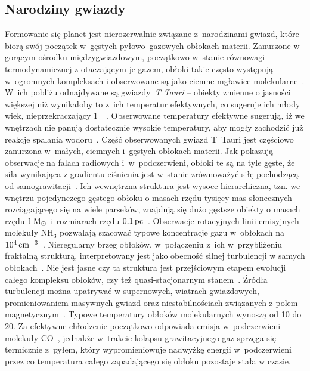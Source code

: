 \subsection{Narodziny gwiazdy}
Formowanie się planet jest nierozerwalnie związane z~narodzinami gwiazd, które
biorą swój początek w~gęstych pyłowo--gazowych obłokach materii. Zanurzone w
gorącym ośrodku międzygwiazdowym, początkowo w~stanie równowagi termodynamicznej
z otaczającym je gazem, obłoki takie często występują w~ogromnych kompleksach i
obserwowane są jako ciemne mgławice molekularne~\cite{Tielens05}. W~ich pobliżu
odnajdywane są gwiazdy~\emph{T Tauri} -- obiekty zmienne o jasności większej niż
wynikałoby to z~ich temperatur efektywnych, co sugeruje ich młody wiek,
nieprzekraczający 1~\Myr~\cite{H62}. Obserwowane temperatury efektywne sugerują,
iż we wnętrzach nie panują dostatecznie wysokie temperatury, aby mogły zachodzić
już reakcje spalania wodoru~\cite{CK79}. Część obserwowanych gwiazd T~Tauri jest
częściowo zanurzona w~małych, ciemnych i~gęstych obłokach materii. Jak pokazują
obserwacje na falach radiowych i~w~podczerwieni, obłoki te są na tyle gęste, że
siła wynikająca z gradientu ciśnienia jest w~stanie zrównoważyć siłę pochodzącą
od samograwitacji~\cite{WT02}. Ich wewnętrzna struktura jest wysoce
hierarchiczna, tzn. we wnętrzu pojedynczego gęstego obłoku o masach rzędu
tysięcy mas słonecznych rozciągającego się na wiele parseków, znajdują się dużo
gęstsze obiekty o masach rzędu $1\hbox{$\mathrm{\thinspace M_{\odot}}$}$ i~rozmiarach rzędu $0.1\hbox{$\thinspace\textrm{pc}$}$~\cite{M85,
LSM93}. Obserwacje rotacyjnych linii emisyjnych molekuły NH$_3$ pozwalają
szacować typowe koncentracje gazu w~obłokach na $10^{4}\hbox{$\thinspace\textrm{cm}$}^{-3}$~\cite{BM89}.
Nieregularny brzeg obłoków, w~połączeniu z~ich w~przybliżeniu fraktalną
strukturą, interpretowany jest jako obecność silnej turbulencji w samych
obłokach~\cite{E00, FPW91}. Nie jest jasne czy ta struktura jest przejściowym
etapem ewolucji całego kompleksu obłoków, czy też quasi-stacjonarnym
stanem~\cite{L94}. Źródła turbulencji można upatrywać w supernowych, wiatrach
gwiazdowych, promieniowaniem masywnych gwiazd oraz niestabilnościach związanych
z polem magnetycznym~\cite{NP03, MLK04}. 
Typowe temperatury obłoków molekularnych wynoszą od
10 do 20\K. Za efektywne chłodzenie początkowo odpowiada emisja w~podczerwieni
molekuły CO~\cite{MSWG82}, jednakże w~trakcie kolapsu grawitacyjnego gaz sprzęga
się termicznie z~pyłem, który wypromieniowuje nadwyżkę energii
w~podczerwieni~\cite{HN65, MI00} przez co temperatura całego zapadającego się
obłoku pozostaje stała w czasie.

